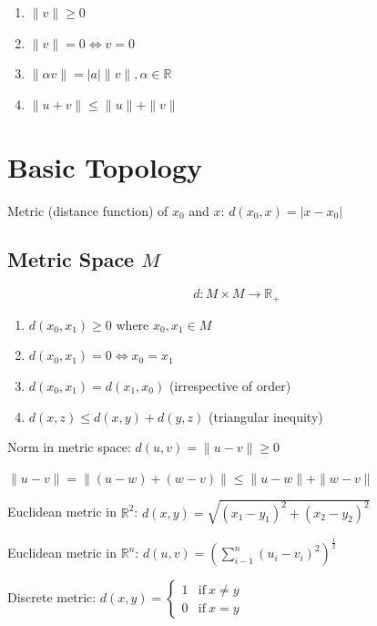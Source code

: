 \documentclass{article}
\newcommand{\abs}[1]{\left| #1 \right|}
\newcommand{\norm}[1]{\| #1 \|}
\begin{document}
    \begin{enumerate}
        \item $\norm{v} \geq 0$
        \item $\norm{v} = 0 \iff v = 0$
        \item $\norm{\alpha v} = \abs{a} \norm{v}, \alpha \in \mathbb{R}$
        \item $\norm{u + v} \leq \norm{u} + \norm{v}$
    \end{enumerate}
    
    \section{Basic Topology}

        Metric (distance function) of $x_{0}$ and $x$: $d(x_{0}, x) = \lvert x - x_{0} \rvert$

    \subsection{Metric Space $M$}

        \begin{displaymath}
        d \colon M \times M \to \mathbb{R}_{+}
        \end{displaymath}

        \begin{enumerate}
            \item $d(x_{0}, x_{1}) \geq 0$ where $x_{0}, x_{1} \in M$
            \item $d(x_{0}, x_{1}) = 0 \iff x_{0} = x_{1}$
            \item $d(x_{0}, x_{1}) = d(x_{1}, x_{0})$ (irrespective of order)
            \item $d(x, z) \leq d(x, y) + d(y, z)$ (triangular inequity)
        \end{enumerate}
    
        Norm in metric space: $d(u, v) = \norm{u - v} \geq 0$
        
        $\norm{u - v} = \norm{(u - w) + (w - v)} \leq \norm{u - w} + \norm{w - v}$

        Euclidean metric in $\mathbb{R}^{2}$:
        $d(x, y) = \sqrt{(x_{1} - y_{1})^{2} + (x_{2} - y_{2})^{2}}$
        
        Euclidean metric in $\mathbb{R}^{n}$: $d(u, v) = (\sum_{i - 1}^{n} (u_{i} - v_{i})^{2})^{\frac{1}{2}}$

        Discrete metric: $d(x, y) = \left\{\begin{matrix}
        1 &\mbox{if}\ x \neq y \\
        0 &\mbox{if}\ x = y 
        \end{matrix}\right.$
        
\end{document}
